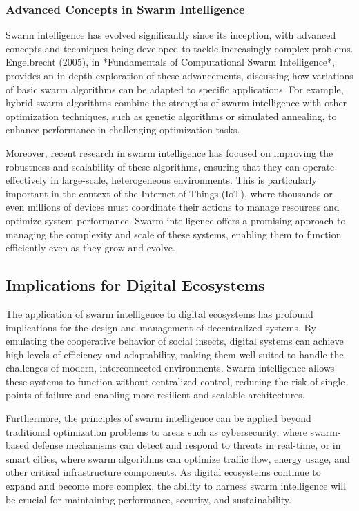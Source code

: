 \documentclass[12pt,twoside]{article}
\begin{document}
\subsubsection{Advanced Concepts in Swarm Intelligence}

Swarm intelligence has evolved significantly since its inception, with advanced concepts and techniques being developed to tackle increasingly complex problems. Engelbrecht (2005), in *Fundamentals of Computational Swarm Intelligence*, provides an in-depth exploration of these advancements, discussing how variations of basic swarm algorithms can be adapted to specific applications. For example, hybrid swarm algorithms combine the strengths of swarm intelligence with other optimization techniques, such as genetic algorithms or simulated annealing, to enhance performance in challenging optimization tasks.

Moreover, recent research in swarm intelligence has focused on improving the robustness and scalability of these algorithms, ensuring that they can operate effectively in large-scale, heterogeneous environments. This is particularly important in the context of the Internet of Things (IoT), where thousands or even millions of devices must coordinate their actions to manage resources and optimize system performance. Swarm intelligence offers a promising approach to managing the complexity and scale of these systems, enabling them to function efficiently even as they grow and evolve.

\subsection{Implications for Digital Ecosystems}

The application of swarm intelligence to digital ecosystems has profound implications for the design and management of decentralized systems. By emulating the cooperative behavior of social insects, digital systems can achieve high levels of efficiency and adaptability, making them well-suited to handle the challenges of modern, interconnected environments. Swarm intelligence allows these systems to function without centralized control, reducing the risk of single points of failure and enabling more resilient and scalable architectures.

Furthermore, the principles of swarm intelligence can be applied beyond traditional optimization problems to areas such as cybersecurity, where swarm-based defense mechanisms can detect and respond to threats in real-time, or in smart cities, where swarm algorithms can optimize traffic flow, energy usage, and other critical infrastructure components. As digital ecosystems continue to expand and become more complex, the ability to harness swarm intelligence will be crucial for maintaining performance, security, and sustainability.
\end{document}

